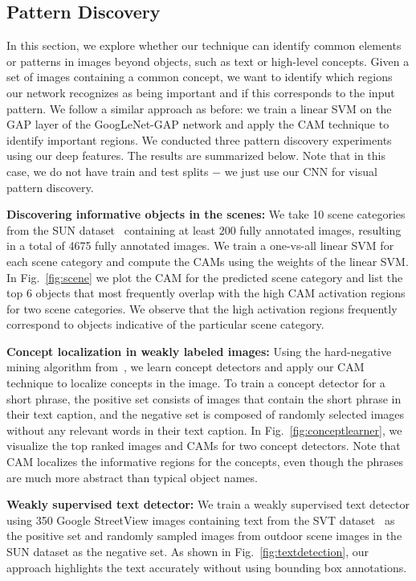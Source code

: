 \documentclass[10pt,twocolumn,letterpaper]{article}
\begin{document}
\subsection{Pattern Discovery}
\label{sec:pattern}

In this section, we explore whether our technique can identify common elements or patterns in images beyond objects, such as text or high-level concepts. Given a set of images containing a common concept, we want to identify which regions our network recognizes as being important and if this corresponds to the input pattern. We follow a similar approach as before: we train a linear SVM on the GAP layer of the GoogLeNet-GAP network and apply the CAM technique to identify important regions. We conducted three pattern discovery experiments using our deep features. The results are summarized below. Note that in this case, we do not have train and test splits $-$ we just use our CNN for visual pattern discovery.






\textbf{Discovering informative objects in the scenes:} We take 10 scene categories from the SUN dataset~\cite{xiao2010sun} containing at least $200$ fully annotated images, resulting in a total of 4675 fully annotated images. We train a one-vs-all linear SVM for each scene category and compute the CAMs using the weights of the linear SVM. In Fig.~\ref{fig:scene} we plot the CAM for the predicted scene category and list the top 6 objects that most frequently overlap with the high CAM activation regions for two scene categories. We observe that the high activation regions frequently correspond to objects indicative of the particular scene category.



\textbf{Concept localization in weakly labeled images:} Using the hard-negative mining algorithm from~\cite{zhou2014conceptlearner}, we learn concept detectors and apply our CAM technique to localize  concepts in the image. To train a concept detector for a short phrase, the positive set consists of  images that contain the short phrase in their text caption, and the negative set is composed of randomly selected images without any relevant words in their text caption. In Fig.~\ref{fig:conceptlearner}, we visualize the top ranked images and CAMs for two concept detectors. Note that CAM localizes the informative regions for the concepts, even though the phrases are much more abstract than typical object names.

\textbf{Weakly supervised text detector:} We train a weakly supervised text detector using 350 Google StreetView images containing text from the SVT dataset~\cite{wang2011end} as the positive set and randomly sampled images from outdoor scene images in the SUN dataset \cite{xiao2010sun} as the negative set. As shown in Fig.~\ref{fig:textdetection}, our approach highlights the text accurately without using bounding box annotations.
\end{document}
